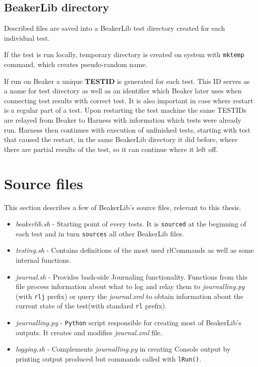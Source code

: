 \subsection{BeakerLib directory}
\label{beakerlib_dir}
Described files are saved into a BeakerLib test directory created for each individual test. 

If the test is run locally, temporary directory is created on system with \texttt{mktemp} command, which creates pseudo-random name.

If run on Beaker a unique \textbf{TESTID} is generated for each test. This ID serves as a name for test directory as well as an identifier which Beaker later uses when connecting test results with correct test. It is also important in case where restart is a regular part of a test. Upon restarting the test machine the same TESTIDs are relayed from Beaker to Harness with information which tests were already run. Harness then continues with execution of unfinished tests, starting with test that caused the restart, in the same BeakerLib directory it did before, where there are partial results of the test, so it can continue where it left off.

\section{Source files}
This section describes a few of BeakerLib's source files, relevant to this thesis.
\begin{itemize}
\item \textit{beakerlib.sh} - Starting point of every tests. It is \texttt{sourced} at the beginning of each test and in turn \texttt{sources} all other BeakerLib files.
\item \textit{testing.sh} - Contains definitions of the most used rlCommands as well as some internal functions.
\item \textit{journal.sh} - Provides bash-side Journaling functionality. Functions from this file process information about what to log and relay them to \textit{journalling.py} (with \texttt{rlj} prefix) or query the \textit{journal.xml} to obtain information about the current state of the test(with standard \texttt{rl} prefix).
\item \textit{journalling.py} - \texttt{Python} script responsible for creating most of BeakerLib's outputs. It creates and modifies \textit{journal.xml} file.
\item \textit{logging.sh} - Complements \textit{journalling.py} in creating Console output by printing output produced but commands called with \texttt{lRun()}.
\end{itemize}

